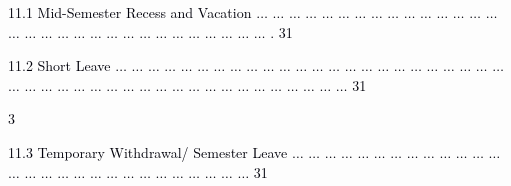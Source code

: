 \documentclass[12pt]{article}
\begin{document}
\vspace{\baselineskip}
\begin{adjustwidth}{0.21in}{0.0in}
{\fontsize{7pt}{8.4pt}\selectfont \textcolor[HTML]{00000A}{11.1 Mid-Semester Recess and Vacation $ \ldots $ $ \ldots $ $ \ldots $ $ \ldots $ $ \ldots $ $ \ldots $ $ \ldots $ $ \ldots $ $ \ldots $ $ \ldots $ $ \ldots $ $ \ldots $ $ \ldots $ $ \ldots $ $ \ldots $ $ \ldots $ $ \ldots $ $ \ldots $ $ \ldots $ $ \ldots $ $ \ldots $ $ \ldots $ $ \ldots $ $ \ldots $ $ \ldots $ $ \ldots $ $ \ldots $ $ \ldots $ $ \ldots $ $ \ldots $ $ \ldots $ . 31}\par}\par

\end{adjustwidth}


\vspace{\baselineskip}
\begin{adjustwidth}{0.21in}{0.0in}
{\fontsize{7pt}{8.4pt}\selectfont \textcolor[HTML]{00000A}{11.2 Short Leave $ \ldots $ $ \ldots $ $ \ldots $ $ \ldots $ $ \ldots $ $ \ldots $ $ \ldots $ $ \ldots $ $ \ldots $ $ \ldots $ $ \ldots $ $ \ldots $ $ \ldots $ $ \ldots $ $ \ldots $ $ \ldots $ $ \ldots $ $ \ldots $ $ \ldots $ $ \ldots $ $ \ldots $ $ \ldots $ $ \ldots $ $ \ldots $ $ \ldots $ $ \ldots $ $ \ldots $ $ \ldots $ $ \ldots $ $ \ldots $ $ \ldots $ $ \ldots $ $ \ldots $ $ \ldots $ $ \ldots $ $ \ldots $ $ \ldots $ $ \ldots $ $ \ldots $ $ \ldots $ $ \ldots $ $ \ldots $ $ \ldots $ $ \ldots $ $ \ldots $  31}\par}\par

\end{adjustwidth}


\vspace{\baselineskip}
\begin{adjustwidth}{0.0in}{-0.3in}
\begin{Center}
\textcolor[HTML]{00000A}{3}
\end{Center}\par

\end{adjustwidth}


\vspace{\baselineskip}
\begin{adjustwidth}{0.21in}{0.0in}
{\fontsize{7pt}{8.4pt}\selectfont \textcolor[HTML]{00000A}{11.3 Temporary Withdrawal/ Semester Leave $ \ldots $ $ \ldots $ $ \ldots $ $ \ldots $ $ \ldots $ $ \ldots $ $ \ldots $ $ \ldots $ $ \ldots $ $ \ldots $ $ \ldots $ $ \ldots $ $ \ldots $ $ \ldots $ $ \ldots $ $ \ldots $ $ \ldots $ $ \ldots $ $ \ldots $ $ \ldots $ $ \ldots $ $ \ldots $ $ \ldots $ $ \ldots $ $ \ldots $ $ \ldots $ $ \ldots $ $ \ldots $  31}\par}\par

\end{adjustwidth}
\end{document}
